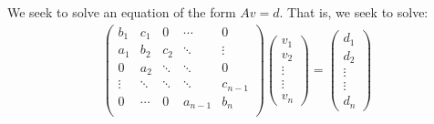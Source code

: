 \documentclass[a4paper,10pt]{scrartcl}\sloppy
\theoremstyle{definition}
\begin{document}
We seek to solve an equation of the form $Av=d$. That is, we seek to solve:
\begin{align}\label{eq:matrixeq}
\begin{pmatrix}
   b_1 & c_1 & 0 &  \cdots  &0  \\
   a_1 & b_2 & c_2   &\ddots  & \vdots \\
   0 & a_2 & \ddots   & \ddots   &0 \\
   \vdots   & \ddots &\ddots & \ddots &c_{n-1} \\
   0 & \cdots  &0  & a_{n-1}  &b_n \\
\end{pmatrix}
\begin{pmatrix}
v_1\\
v_2\\
\vdots\\
\vdots\\
v_n
\end{pmatrix}
=
\begin{pmatrix}
d_1\\
d_2\\
\vdots\\
\vdots\\
d_n
\end{pmatrix}
\end{align}
\end{document}
